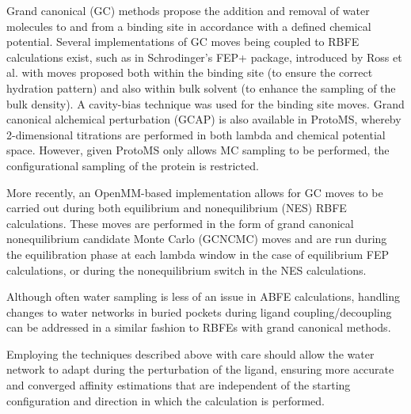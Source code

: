 \documentclass[9pt,bestpractices,pubversion]{livecoms}
\begin{document}
Grand canonical (GC) methods propose the addition and removal of water molecules to and from a binding site in accordance with a defined chemical potential. Several implementations of GC moves being coupled to RBFE calculations exist, such as in Schrodinger's FEP+ package, introduced by Ross et al.\cite{ross2020enhancing} with moves proposed both within the binding site (to ensure the correct hydration pattern) and also within bulk solvent (to enhance the sampling of the bulk density). A cavity-bias technique was used for the binding site moves. Grand canonical alchemical perturbation (GCAP)\cite{brucemacdonald2018ligand} is also available in ProtoMS\cite{woods2018protoms}, whereby 2-dimensional titrations are performed in both lambda and chemical potential space. However, given ProtoMS only allows MC sampling to be performed, the configurational sampling of the protein is restricted.

More recently, an OpenMM-based implementation allows for GC moves to be carried out during both equilibrium and nonequilibrium (NES) RBFE calculations\cite{melling2025developing}. These moves are performed in the form of grand canonical nonequilibrium candidate Monte Carlo (GCNCMC) moves\cite{melling2023enhanced} and are run during the equilibration phase at each lambda window in the case of equilibrium FEP calculations, or during the nonequilibrium switch in the NES calculations.

Although often water sampling is less of an issue in ABFE calculations, handling changes to water networks in buried pockets during ligand coupling/decoupling can be addressed in a similar fashion to RBFEs with grand canonical methods.


Employing the techniques described above with care should allow the water network to adapt during the perturbation of the ligand, ensuring more accurate and converged affinity estimations that are independent of the starting configuration and direction in which the calculation is performed.
\end{document}
